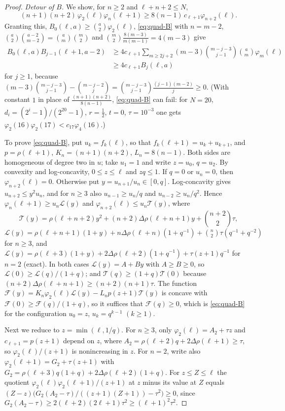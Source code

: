 \begin{proof}
\emph{Detour of $B$.} We show, for $n\geq2$ and $\ell+n+2\leq N$,
\begin{equation}\label{eq:quad-B}
(n+1)(n+2)\,\varphi_2(\ell)\varphi_n(\ell+1)\geq8(n-1)\,c_{\ell+1}\varphi_{n+2}(\ell).
\end{equation}
Granting this, $B_0(\ell,a)\geq\binom a2\varphi_2(\ell)$, \eqref{eq:quad-B} with $n=m-2$, $\binom a2\binom{a-2}{m-2}=\binom am\binom m2$ and $\binom m2\frac{8(m-3)}{m(m-1)}=4(m-3)$ give
\[
\begin{aligned}
B_0(\ell,a)B_{j-1}(\ell+1,a-2)&\geq4c_{\ell+1}\sum_{m\geq2j+2}(m-3)\binom{m-j-3}{j-1}\binom am\varphi_m(\ell)\\
&\geq4c_{\ell+1}B_j(\ell,a)
\end{aligned}
\]
for $j\geq1$, because $(m-3)\binom{m-j-3}{j-1}-\binom{m-j-2}j=\binom{m-j-3}{j-1}\frac{(j-1)(m-2)}j\geq0$. (With constant $1$ in place of $\frac{(n+1)(n+2)}{8(n-1)}$, \eqref{eq:quad-B} can fail: for $N=20$, $d_i=(2^i-1)/(2^{20}-1)$, $r=\frac12$, $t=0$, $\tau=10^{-3}$ one gets $\varphi_2(16)\varphi_2(17)<c_{17}\varphi_4(16)$.)

To prove \eqref{eq:quad-B}, put $u_k=f_k(\ell)$, so that $f_k(\ell+1)=u_k+u_{k+1}$, and $p=\rho(\ell+1)$, $K_n=(n+1)(n+2)$, $L_n=8(n-1)$. Both sides are homogeneous of degree two in $u$; take $u_1=1$ and write $z=u_0$, $q=u_2$. By convexity and log-concavity, $0\leq z\leq\ell$ and $zq\leq1$. If $q=0$ or $u_n=0$, then $\varphi_{n+2}(\ell)=0$. Otherwise put $y=u_{n+1}/u_n\in[0,q]$. Log-concavity gives $u_{n+2}\leq y^2u_n$, and for $n\geq3$ also $u_{n-1}\geq u_n/q$ and $u_{n-2}\geq u_n/q^2$. Hence $\varphi_n(\ell+1)\geq u_n\mathcal L(y)$ and $\varphi_{n+2}(\ell)\leq u_n\mathcal T(y)$, where
\[
\mathcal T(y)=\rho(\ell+n+2)y^2+(n+2)\Delta\rho(\ell+n+1)y+\binom{n+2}2\tau,
\]
$\mathcal L(y)=\rho(\ell+n+1)(1+y)+n\Delta\rho(\ell+n)(1+q^{-1})+\binom n2\tau(q^{-1}+q^{-2})$ for $n\geq3$, and $\mathcal L(y)=\rho(\ell+3)(1+y)+2\Delta\rho(\ell+2)(1+q^{-1})+\tau(z+1)q^{-1}$ for $n=2$ (exact). In both cases $\mathcal L(y)=A+By$ with $A\geq B\geq0$, so $\mathcal L(0)\geq\mathcal L(q)/(1+q)$; and $\mathcal T(q)\geq(1+q)\mathcal T(0)$ because $(n+2)\Delta\rho(\ell+n+1)\geq(n+2)(n+1)\tau$. The function $\mathcal F(y)=K_n\varphi_2(\ell)\mathcal L(y)-L_np(z+1)\mathcal T(y)$ is concave with $\mathcal F(0)\geq\mathcal F(q)/(1+q)$, so it suffices that $\mathcal F(q)\geq0$, which is \eqref{eq:quad-B} for the configuration $u_0=z$, $u_k=q^{k-1}$ $(k\geq1)$.

Next we reduce to $z=\min(\ell,1/q)$. For $n\geq3$, only $\varphi_2(\ell)=A_2+\tau z$ and $c_{\ell+1}=p(z+1)$ depend on $z$, where $A_2=\rho(\ell+2)q+2\Delta\rho(\ell+1)\geq\tau$, so $\varphi_2(\ell)/(z+1)$ is nonincreasing in $z$. For $n=2$, write also $\varphi_2(\ell+1)=G_2+\tau(z+1)$ with $G_2=\rho(\ell+3)q(1+q)+2\Delta\rho(\ell+2)(1+q)$. For $z\leq Z\leq\ell$ the quotient $\varphi_2(\ell)\varphi_2(\ell+1)/(z+1)$ at $z$ minus its value at $Z$ equals $(Z-z)\bigl(G_2(A_2-\tau)/((z+1)(Z+1))-\tau^2\bigr)\geq0$, since $G_2(A_2-\tau)\geq2(\ell+2)(2\ell+1)\tau^2\geq(\ell+1)^2\tau^2$.


\end{proof}
